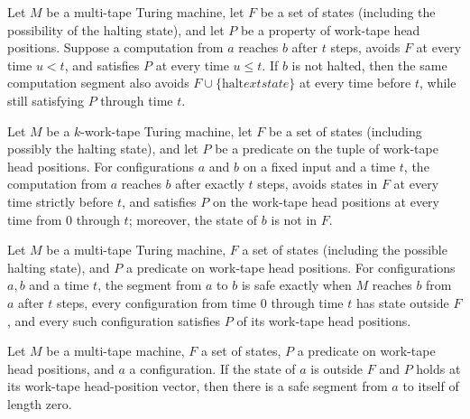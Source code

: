 \begin{theorem}
\label{Turing.Segment.live}
\leanok
{}
Let $M$ be a multi-tape Turing machine, let $F$ be a set of states (including the
possibility of the halting state), and let $P$ be a property of work-tape head
positions. Suppose a computation from $a$ reaches $b$ after $t$ steps, avoids $F$ at
every time $u<t$, and satisfies $P$ at every time $u\le t$. If $b$ is not halted, then
the same computation segment also avoids $F\cup\{\text{halt}	ext{ state}\}$ at every
time before $t$, while still satisfying $P$ through time $t$.
\end{theorem}

\begin{definition}
\label{Turing.SafeSegment}
\leanok
{}
Let $M$ be a $k$-work-tape Turing machine, let $F$ be a set of states (including
possibly the halting state), and let $P$ be a predicate on the tuple of work-tape head
positions. For configurations $a$ and $b$ on a fixed input and a time $t$, the
computation from $a$ reaches $b$ after exactly $t$ steps, avoids states in $F$ at every
time strictly before $t$, and satisfies $P$ on the work-tape head positions at every
time from $0$ through $t$; moreover, the state of $b$ is not in $F$.
\end{definition}

\begin{theorem}
\label{Turing.safeSegment_iff}
\leanok
{}
Let $M$ be a multi-tape Turing machine, $F$ a set of states (including the possible
halting state), and $P$ a predicate on work-tape head positions. For configurations
$a,b$ and a time $t$, the segment from $a$ to $b$ is safe exactly when $M$ reaches $b$
from $a$ after $t$ steps, every configuration from time $0$ through time $t$ has state
outside $F$, and every such configuration satisfies $P$ of its work-tape head positions.
\end{theorem}

\begin{theorem}
\label{Turing.SafeSegment.zero}
\leanok
{}
Let $M$ be a multi-tape machine, $F$ a set of states, $P$ a predicate on work-tape head
positions, and $a$ a configuration. If the state of $a$ is outside $F$ and $P$ holds at
its work-tape head-position vector, then there is a safe segment from $a$ to itself of
length zero.
\end{theorem}

